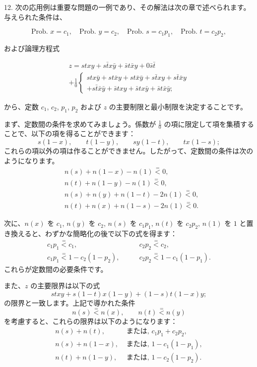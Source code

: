 \documentclass[a4paper,11pt,openany]{ltjsbook}
\begin{document}
12. 次の応用例は重要な問題の一例であり、その解法は次の章で述べられます。与えられた条件は、

\[
  \text{Prob. }x = c_1,   \quad
  \text{Prob. }y = c_2,   \quad
  \text{Prob. }s = c_1p_1,\quad
  \text{Prob. }t = c_2p_2,
\]

および論理方程式

\[
\begin{split}
  z = stxy + s\bar{t}x\bar{y} + \bar{s}t\bar{x}y + 0\bar{s}\bar{t} \\
  + \frac{1}{0}\left\{
  \begin{split}
    stx\bar{y} + st\bar{x}y + st\bar{x}\bar{y} + s\bar{t}xy
      + s\bar{t}\bar{x}y   \\
    + s\bar{t}\bar{x}\bar{y} + \bar{s}txy + \bar{s}tx\bar{y}
      + \bar{s}t\bar{x}\bar{y};
\end{split}
\right.
\end{split}
\]

から、定数 $c_1$, $c_2$, $p_1$, $p_2$ および $z$ の主要制限と最小制限を決定することです。

まず、定数間の条件を求めてみましょう。係数が $\frac{1}{0}$ の項に限定して項を集積することで、以下の項を得ることができます：
\[
s(1-x), \qquad t(1-y), \qquad sy(1-t), \qquad tx(1-s);
\]
これらの項以外の項は作ることができません。したがって、定数間の条件は次のようになります。
\begin{align*}
&n(s) + n(1-x) - n(1) \stackrel{=}{<} 0,\\
&n(t) + n(1-y) - n(1) \stackrel{=}{<} 0,\\
&n(s) + n(y) + n(1-t) - 2n(1) \stackrel{=}{<} 0,\\
&n(t) + n(x) + n(1-s) - 2n(1) \stackrel{=}{<} 0.
\end{align*}

次に、$n(x)$ を $c_1$, $n(y)$ を $c_2$, $n(s)$ を $c_1 p_1$, $n(t)$ を $c_2 p_2$, $n(1)$ を $1$ と置き換えると、わずかな簡略化の後で以下の式を得ます：
\[
\begin{array}{cccccc}
  c_1 p_1 \stackrel{=}{<} c_1, \qquad
& c_2 p_2 \stackrel{=}{<} c_2,\\
  c_1 p_1 \stackrel{=}{<} 1 - c_2(1-p_2), \qquad
& c_2 p_2 \stackrel{=}{<} 1 - c_1(1-p_1).
\end{array}
\]
これらが定数間の必要条件です。

また、$z$ の主要限界は以下の式
\[
stxy + s(1-t) x(1-y) + (1-s)t(1-x)y;
\]
の限界と一致します。上記で導かれた条件
\[
n(s) \stackrel{=}{<} n(x), \qquad n(t) \stackrel{=}{<} n(y)
\]
を考慮すると、これらの限界は以下のようになります：
\begin{align*}
n(s) + n(t),   &\text{ または, } c_1p_1 + c_2p_2,\\
n(s) + n(1-x), &\text{ または, } 1 - c_1 (1-p_1),\\
n(t) + n(1-y), &\text{ または, } 1 - c_2 (1-p_2).
\end{align*}
\end{document}
